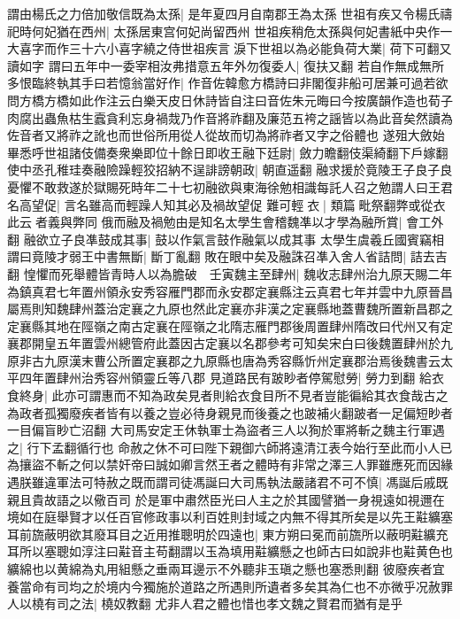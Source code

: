 謂由楊氏之力倍加敬信既為太孫|{
	是年夏四月自南郡王為太孫}
世祖有疾又令楊氏禱祀時何妃猶在西州|{
	太孫居東宫何妃尚留西州}
世祖疾稍危太孫與何妃書紙中央作一大喜字而作三十六小喜字繞之侍世祖疾言淚下世祖以為必能負荷大業|{
	荷下可翻又讀如字}
謂曰五年中一委宰相汝弗措意五年外勿復委人|{
	復扶又翻}
若自作無成無所多恨臨終執其手曰若憶翁當好作|{
	作音佐韓愈方橋詩曰非閣復非船可居兼可過若欲問方橋方橋如此作注云白樂天皮日休詩皆自注曰音佐朱元晦曰今按廣韻作造也荀子肉腐出蟲魚枯生蠧貪利忘身禍烖乃作音將祚翻及廉范五袴之謡皆以為此音矣然讀為佐音者又將祚之訛也而世俗所用從人從故而切為將祚者又字之俗體也}
遂殂大斂始畢悉呼世祖諸伎備奏衆樂即位十餘日即收王融下廷尉|{
	斂力瞻翻伎渠綺翻下戶嫁翻}
使中丞孔稚珪奏融險躁輕狡招納不逞誹謗朝政|{
	朝直遥翻}
融求援於竟陵王子良子良憂懼不敢救遂於獄賜死時年二十七初融欲與東海徐勉相識每託人召之勉謂人曰王君名高望促|{
	言名雖高而輕躁人知其必及禍故望促}
難可輕衣|{
	類篇毗祭翻弊或從衣此云者義與弊同}
俄而融及禍勉由是知名太學生會稽魏凖以才學為融所賞|{
	會工外翻}
融欲立子良凖鼓成其事|{
	鼓以作氣言鼓作融氣以成其事}
太學生虞羲丘國賓竊相謂曰竟陵才弱王中書無斷|{
	斷丁亂翻}
敗在眼中矣及融誅召凖入舍人省詰問|{
	詰去吉翻}
惶懼而死舉體皆青時人以為膽破　壬寅魏主至肆州|{
	魏收志肆州治九原天賜二年為鎮真君七年置州領永安秀容雁門郡而永安郡定襄縣注云真君七年并雲中九原晉昌屬焉則知魏肆州蓋治定襄之九原也然此定襄亦非漢之定襄縣地蓋曹魏所置新昌郡之定襄縣其地在陘嶺之南古定襄在陘嶺之北隋志雁門郡後周置肆州隋改曰代州又有定襄郡開皇五年置雲州總管府此蓋因古定襄以名郡參考可知矣宋白曰後魏置肆州於九原非古九原漢末曹公所置定襄郡之九原縣也唐為秀容縣忻州定襄郡治焉後魏書云太平四年置肆州治秀容州領靈丘等八郡}
見道路民有跛眇者停駕慰勞|{
	勞力到翻}
給衣食終身|{
	此亦可謂惠而不知為政矣見者則給衣食目所不見者豈能徧給其衣食哉古之為政者孤獨廢疾者皆有以養之豈必待身親見而後養之也跛補火翻跛者一足偏短眇者一目偏盲眇亡沼翻}
大司馬安定王休執軍士為盜者三人以狥於軍將斬之魏主行軍遇之|{
	行下孟翻循行也}
命赦之休不可曰陛下親御六師將遠清江表今始行至此而小人已為攘盜不斬之何以禁奸帝曰誠如卿言然王者之體時有非常之澤三人罪雖應死而因緣遇朕雖違軍法可特赦之既而謂司徒馮誕曰大司馬執法嚴諸君不可不慎|{
	馮誕后戚既親且貴故語之以儆百司}
於是軍中肅然臣光曰人主之於其國譬猶一身視遠如視邇在境如在庭舉賢才以任百官修政事以利百姓則封域之内無不得其所矣是以先王黈纊塞耳前旒蔽明欲其廢耳目之近用推聰明於四遠也|{
	東方朔曰冕而前旒所以蔽明黈纊充耳所以塞聰如淳注曰黈音主苟翻謂以玉為填用黈纊懸之也師古曰如說非也黈黄色也纊綿也以黄綿為丸用組懸之垂兩耳邊示不外聽非玉瑱之懸也塞悉則翻}
彼廢疾者宜養當命有司均之於境内今獨施於道路之所遇則所遺者多矣其為仁也不亦微乎况赦罪人以橈有司之法|{
	橈奴教翻}
尤非人君之體也惜也孝文魏之賢君而猶有是乎

